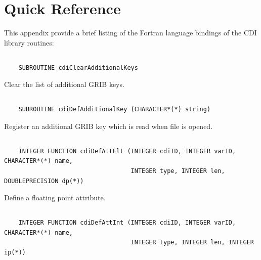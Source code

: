 \chapter*{Quick Reference}

This appendix provide a brief listing of the Fortran language bindings of the CDI library routines:

\section*{\tt {}}

\begin{verbatim}
    SUBROUTINE cdiClearAdditionalKeys
\end{verbatim}

Clear the list of additional GRIB keys.


\section*{\tt {}}

\begin{verbatim}
    SUBROUTINE cdiDefAdditionalKey (CHARACTER*(*) string)
\end{verbatim}

Register an additional GRIB key which is read when file is opened.


\section*{\tt {}}

\begin{verbatim}
    INTEGER FUNCTION cdiDefAttFlt (INTEGER cdiID, INTEGER varID, CHARACTER*(*) name,
                                   INTEGER type, INTEGER len, DOUBLEPRECISION dp(*))
\end{verbatim}

Define a floating point attribute.


\section*{\tt {}}

\begin{verbatim}
    INTEGER FUNCTION cdiDefAttInt (INTEGER cdiID, INTEGER varID, CHARACTER*(*) name,
                                   INTEGER type, INTEGER len, INTEGER ip(*))
\end{verbatim}

